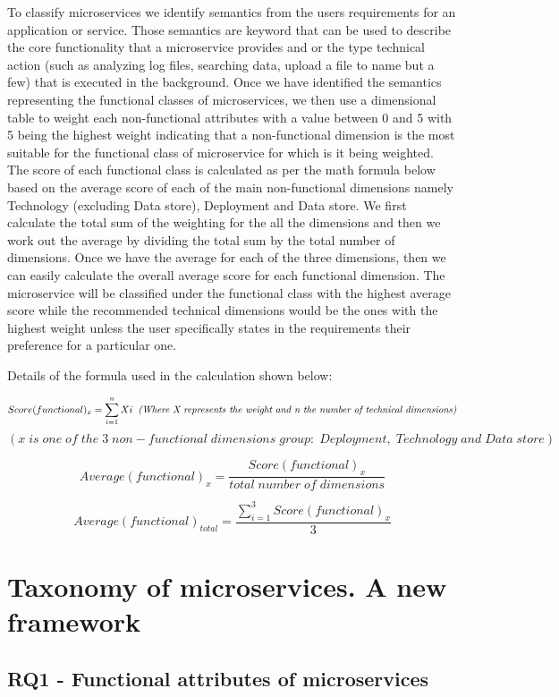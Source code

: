 \documentclass{article}
\begin{document}
To classify microservices we identify semantics from the users requirements for an application or service. Those semantics are keyword that can be used to describe the core functionality that a microservice provides and or the type technical action (such as analyzing log files, searching data, upload a file to name but a few) that is executed in the background. Once we have identified the semantics representing the functional classes of microservices, we then use a dimensional table to weight each non-functional attributes with a value between 0 and 5 with 5 being the highest weight indicating that a non-functional dimension is the most suitable for the functional class of microservice for which is it being weighted. The score of each functional class is calculated as per the math formula below based on the average score of each of the main non-functional dimensions namely Technology (excluding Data store), Deployment and Data store. We first calculate the total sum of the weighting for the all the dimensions and then we work out the average by dividing the total sum by the total number of dimensions. Once we have the average for each of the three dimensions, then we can easily calculate the overall average score for each functional dimension. The microservice will be classified under the functional class with the highest average score while the recommended technical dimensions would be the ones with the highest weight unless the user specifically states in the requirements their preference for a particular one.

Details of the formula used in the calculation shown below:

\[Score(functional)_{x}=\sum_{i=1}^{n}Xi \; \; \text{\textit{(Where X represents the weight and n the number of technical dimensions)}}\] 
\[(x \;is\; one\; of\; the \;3 \;non-functional \;dimensions\; group: \;Deployment,\; Technology \;and \;Data\; store) \]

\[Average(functional)_{x}=\frac{Score(functional)_{x}}{total \; number \; of \; dimensions} \]

\[Average(functional)_{total}=\frac{\sum_{i=1}^{3}Score(functional)_{x}}{3} \]

\section{Taxonomy of microservices. A new framework}

\subsection{RQ1 - Functional attributes of microservices}
\end{document}
